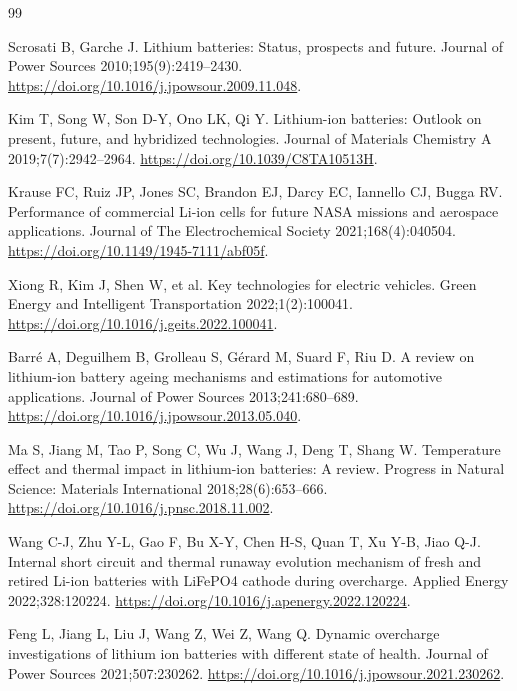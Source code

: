 \begingroup

\fontsize{9.4pt}{12.2pt}\selectfont

\setlength{\emergencystretch}{2em}

\sloppy

\begin{thebibliography}{99}

\setlength{\itemsep}{0.25ex}

 Scrosati B, Garche J. Lithium batteries: Status, prospects and future. Journal of Power Sources 2010;195(9):2419–2430. \url{https://doi.org/10.1016/j.jpowsour.2009.11.048}.

 Kim T, Song W, Son D-Y, Ono LK, Qi Y. Lithium-ion batteries: Outlook on present, future, and hybridized technologies. Journal of Materials Chemistry A 2019;7(7):2942–2964. \url{https://doi.org/10.1039/C8TA10513H}.

 Krause FC, Ruiz JP, Jones SC, Brandon EJ, Darcy EC, Iannello CJ, Bugga RV. Performance of commercial Li-ion cells for future NASA missions and aerospace applications. Journal of The Electrochemical Society 2021;168(4):040504. \url{https://doi.org/10.1149/1945-7111/abf05f}.

 Xiong R, Kim J, Shen W, et al. Key technologies for electric vehicles. Green Energy and Intelligent Transportation 2022;1(2):100041. \url{https://doi.org/10.1016/j.geits.2022.100041}.

 Barré A, Deguilhem B, Grolleau S, Gérard M, Suard F, Riu D. A review on lithium-ion battery ageing mechanisms and estimations for automotive applications. Journal of Power Sources 2013;241:680–689. \url{https://doi.org/10.1016/j.jpowsour.2013.05.040}.

 Ma S, Jiang M, Tao P, Song C, Wu J, Wang J, Deng T, Shang W. Temperature effect and thermal impact in lithium-ion batteries: A review. Progress in Natural Science: Materials International 2018;28(6):653–666. \url{https://doi.org/10.1016/j.pnsc.2018.11.002}.

 Wang C-J, Zhu Y-L, Gao F, Bu X-Y, Chen H-S, Quan T, Xu Y-B, Jiao Q-J. Internal short circuit and thermal runaway evolution mechanism of fresh and retired Li-ion batteries with LiFePO4 cathode during overcharge. Applied Energy 2022;328:120224. \url{https://doi.org/10.1016/j.apenergy.2022.120224}.

 Feng L, Jiang L, Liu J, Wang Z, Wei Z, Wang Q. Dynamic overcharge investigations of lithium ion batteries with different state of health. Journal of Power Sources 2021;507:230262. \url{https://doi.org/10.1016/j.jpowsour.2021.230262}.


\end{thebibliography}
